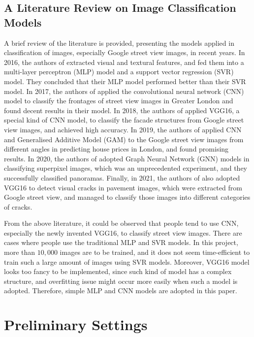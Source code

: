 \documentclass[11pt,twoside]{article}
\numberwithin{Theorem}{section}
\numberwithin{Definition}{section}
\numberwithin{Lemma}{section}
\numberwithin{Algorithm}{section}
\numberwithin{equation}{section}
\begin{document}
\subsection{A Literature Review on Image Classification Models}
A brief review of the literature is provided, presenting the models applied in classification of images, especially Google street view images, in recent years. In 2016, the authors of \cite{ahmed2016house} extracted visual and textural features, and fed them into a multi-layer perceptron (MLP) model and a support vector regression (SVR) model. They concluded that their MLP model performed better than their SVR model. In 2017, the authors of \cite{law2017application} applied the convolutional neural network (CNN) model to classify the frontages of street view images in Greater London and found decent results in their model. In 2018, the authors of \cite{kang2018building} applied VGG16, a special kind of CNN model, to classify the facade structures from Google street view images, and achieved high accuracy. In 2019, the authors of \cite{law2019take} applied CNN and Generalised Additive Model (GAM) to the Google street view images from different angles in predicting house prices in London, and found promising results. In 2020, the authors of \cite{avelar2020superpixel} adopted Graph Neural Network (GNN) models in classifying superpixel images, which was an unprecedented experiment, and they successfully classified panoramas. Finally, in 2021, the authors of \cite{maniat2021deep} also adopted VGG16 to detect visual cracks in pavement images, which were extracted from Google street view, and managed to classify those images into different categories of cracks.

From the above literature, it could be observed that people tend to use CNN, especially the newly invented VGG16, to classify street view images. There are cases where people use the traditional MLP and SVR models. In this project, more than $10,000$ images are to be trained, and it does not seem time-efficient to train such a large amount of images using SVR models. Moreover, VGG16 model looks too fancy to be implemented, since such kind of model has a complex structure, and overfitting issue might occur more easily when such a model is adopted. Therefore, simple MLP and CNN models are adopted in this paper.

\section{Preliminary Settings}
\label{sec:prelim}
\end{document}
